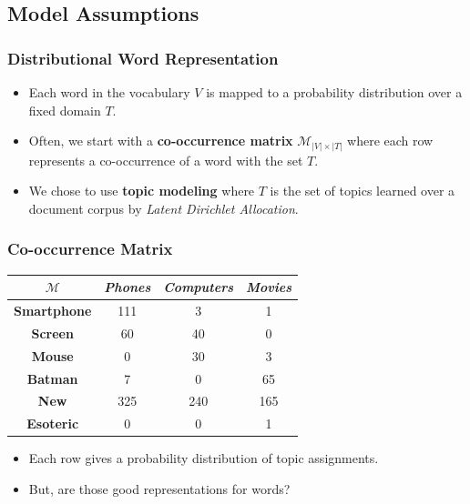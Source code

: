 \documentclass{beamer}
\newcommand\cM{{\mathcal M}}
\begin{document}
\subsection{Model Assumptions}

\begin{frame}
\frametitle{Distributional Word Representation}
\begin{itemize}
\item Each word in the vocabulary $V$ is mapped to a probability
  distribution over a fixed domain $T$.
\item Often, we start with a {\bf co-occurrence matrix} $\cM_{|V|\times|T|}$
  where each row represents a co-occurrence of a word with the set
  $T$. 
\item We chose to use {\bf topic modeling} where $T$ is the set of
  topics learned over a document corpus by {\em Latent Dirichlet
    Allocation}. 
\end{itemize}
\end{frame}

\begin{frame}
\frametitle{Co-occurrence Matrix}
\begin{center}
\begin{tabular}{c|ccc}
$\cM$& {\it Phones} & {\it Computers} & {\it Movies}\\
\hline
{\bf Smartphone} & 111 & 3 & 1\\
 {\bf Screen} & 60 & 40 & 0\\
 {\bf Mouse} & 0 & 30 & 3\\
 {\bf Batman} & 7 & 0 & 65\\
{\bf New} & 325 & 240 & 165\\
{\bf Esoteric} & 0 & 0 & 1
\end{tabular}
\end{center}
\begin{itemize}
\item Each row gives a probability distribution of topic 
assignments. 
\item But, are those good representations for words?
\end{itemize}
\end{frame}
\end{document}
